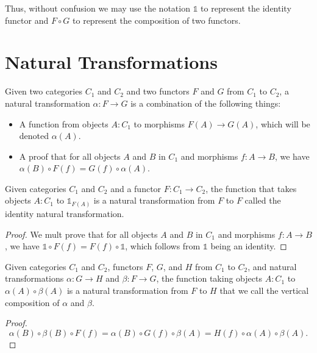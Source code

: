 \documentclass[../math.tex]{subfiles}
\begin{document}
Thus, without confusion we may use the notation $\mathds 1$ to represent the
identity functor and $F \circ G$ to represent the composition of two functors.

\section{Natural Transformations}

\begin{definition}
    Given two categories $C_1$ and $C_2$ and two functors $F$ and $G$ from $C_1$
    to $C_2$, a natural transformation $\alpha : F \to G$ is a combination of
    the following things:
    \begin{itemize}
        \item A function from objects $A : C_1$ to morphisms $F(A) \to G(A)$,
            which will be denoted $\alpha(A)$.
        \item A proof that for all objects $A$ and $B$ in $C_1$ and morphisms $f
            : A \to B$, we have $\alpha(B) \circ F(f) = G(f) \circ \alpha(A)$.
    \end{itemize}
\end{definition}

\begin{theorem}
    Given categories $C_1$ and $C_2$ and a functor $F : C_1 \to C_2$, the
    function that takes objects $A : C_1$ to $\mathds 1_{F(A)}$ is a natural
    transformation from $F$ to $F$ called the identity natural transformation.
\end{theorem}
\begin{proof}
    We mult prove that for all objects $A$ and $B$ in $C_1$ and morphisms $f : A
    \to B$, we have $\mathds 1 \circ F(f) = F(f) \circ \mathds 1$, which follows
    from $\mathds 1$ being an identity.
\end{proof}

\begin{theorem}
    Given categories $C_1$ and $C_2$, functors $F$, $G$, and $H$ from $C_1$
    to $C_2$, and natural transformations $\alpha : G \to H$ and $\beta : F \to
    G$, the function taking objects $A : C_1$ to $\alpha(A) \circ \beta(A)$ is a
    natural transformation from $F$ to $H$ that we call the vertical composition
    of $\alpha$ and $\beta$.
\end{theorem}
\begin{proof}
    \[
        \alpha(B) \circ \beta(B) \circ F(f) =
        \alpha(B) \circ G(f) \circ \beta(A) =
        H(f) \circ \alpha(A) \circ \beta(A).
    \]
\end{proof}
\end{document}
